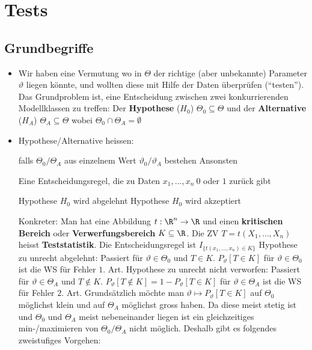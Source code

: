 
\section{Tests}
\subsection{Grundbegriffe}
\begin{itemize}
    \item Wir haben eine Vermutung wo in $\Theta$ der richtige (aber unbekannte) Parameter $\vartheta$ liegen könnte, und wollten diese mit Hilfe der Daten überprüfen (``testen''). Das Grundproblem ist, eine Entscheidung zwischen zwei konkurrierenden Modellklassen zu treffen: Der \textbf{Hypothese} ($H_0$) $\Theta_0 \subseteq \Theta$ und der \textbf{Alternative} ($H_A$) $\Theta_A \subseteq \Theta$ wobei $\Theta_0 \cap \Theta_A = \emptyset$
    \item Hypothese/Alternative heissen:
        \begin{itemize}
             falls $\Theta_0/\Theta_A$ aus einzelnem Wert $\vartheta_0/\vartheta_A$ bestehen
             Ansonsten
        \end{itemize}
     Eine Entscheidungsregel, die zu Daten $x_1, \dots, x_n \ 0$ oder $1$ zurück gibt
        \begin{itemize}
             Hypothese $H_0$ wird abgelehnt
             Hypothese $H_0$ wird akzeptiert
        \end{itemize}
        Konkreter: Man hat eine Abbildung $t: \R^n \to \R$ und einen \textbf{kritischen Bereich} oder \textbf{Verwerfungsbereich} $K \subseteq \R$. Die ZV $T = t(X_1, \dots, X_n)$ heisst \textbf{Teststatistik}. Die Entscheidungsregel ist $I_{\{t(x_1, \dots, x_n) \in K\}}$
         Hypothese zu unrecht abgelehnt: Passiert für $\vartheta \in \Theta_0$ und $T \in K$. $P_\vartheta[T \in K]$ für $\vartheta \in \Theta_0$ ist die WS für Fehler $1.$ Art.
         Hypothese zu unrecht nicht verworfen: Passiert für $\vartheta \in \Theta_A$ und $T \notin K$. $P_\vartheta[T \notin K] = 1 - P_\vartheta[T \in K]$ für $\vartheta \in \Theta_A$ ist die WS für Fehler $2.$ Art.
     Grundsätzlich möchte man $\vartheta \mapsto P_\vartheta[T \in K]$ auf $\Theta_0$ möglichst klein und auf $\Theta_A$ möglichst gross haben. Da diese meist stetig ist und $\Theta_0$ und $\Theta_A$ meist nebeneinander liegen ist ein gleichzeitiges min-/maximieren von $\Theta_0/\Theta_A$ nicht möglich. Deshalb gibt es folgendes zweistufiges Vorgehen:

\end{itemize}
